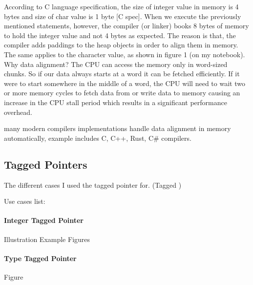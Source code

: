 According to C language specification, the size of integer value in memory is 4 bytes and size of char value is 1 byte [C spec]. When we execute the previously mentioned statements, however, the compiler (or linker) books 8 bytes of memory to hold the integer value and not 4 bytes as expected. The reason is that, the compiler adds paddings to the heap objects in order to align them in memory. The same applies to the character value, as shown in figure 1 (on my notebook). 
\\

Why data alignment? The CPU can access the memory only in word-sized chunks. So if our data always starts at a word it can be fetched efficiently. If it were to start somewhere in the middle of a word, the CPU will need to wait two or more memory cycles to fetch data from or write data to memory causing an increase in the CPU stall period which results in a significant performance overhead. 


many modern compilers implementations handle data alignment in memory automatically, example includes C, C++, Rust, C# compilers.

\subsection{Tagged Pointers}

The different cases I used the tagged pointer for. (Tagged )


Use cases list: 

\paragraph{Integer Tagged Pointer} Illustration Example 
Figures
\paragraph{Type Tagged Pointer} 
Figure